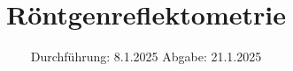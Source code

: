 

\subject{V44}
\title{Röntgenreflektometrie}
\date{%
  Durchführung: 8.1.2025
  \hspace{3em}
  Abgabe: 21.1.2025
}



\maketitle
\thispagestyle{empty}
\tableofcontents
\newpage







\printbibliography{}



